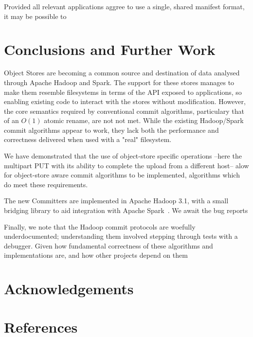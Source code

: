 \documentclass[9pt,technote]{IEEEtran}
\begin{document}
Provided all relevant applications aggree to use a single, shared manifest
format, it may be possible to

\section{Conclusions and Further Work}
\label{sec:conclusions}

Object Stores are becoming a common source and destination of data analysed
through Apache Hadoop and Spark.
The support for these stores manages to make them resemble filesystems in
terms of the API exposed to applications, so enabling existing code to
interact with the stores without modification.
However, the core semantics required by conventional commit algorithms, particulary
that of an $O(1)$ atomic rename, are not not met.
While the existing Hadoop/Spark commit algorithms appear to work, they lack
both the performance and correctness delivered when used with a "real" filesystem.

We have demonstrated that the use of object-store specific operations --here
the multipart PUT with its ability to complete the upload from a different host--
alow for object-store aware commit algorithms to be implemented,
algorithms which do meet these requirements.

The new Committers are implemented in Apache Hadoop 3.1, with a small bridging
library to aid integration with Apache Spark\ \cite{cite}.
We await the bug reports


Finally, we note that the Hadoop commit protocols are woefully underdocumented;
understanding them involved stepping through tests with a debugger.
Given how fundamental correctness of these algorithms and implementations
are, and how other projects depend on them


\section{Acknowledgements}
\label{sec:acknowledgements}


\section{References}
\label{sec:references}



\end{document}
